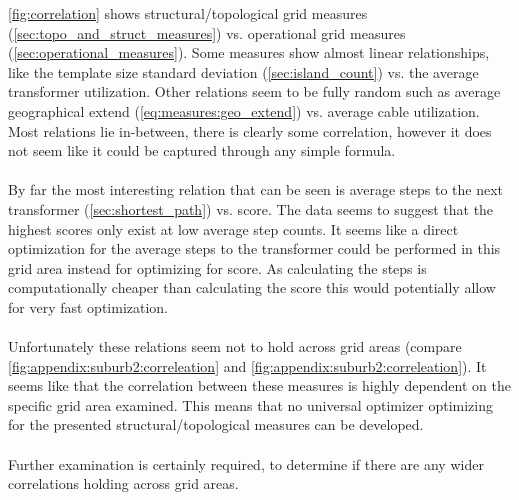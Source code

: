 \autoref{fig:correlation} shows structural/topological grid
measures (\autoref{sec:topo_and_struct_measures}) vs. 
operational grid measures (\autoref{sec:operational_measures}). 
Some measures show almost linear relationships, like
the template size standard deviation (\autoref{sec:island_count}) vs.
the average transformer utilization. Other relations seem
to be fully random such as average geographical extend (\autoref{eq:measures:geo_extend})
vs. average cable utilization. Most relations lie in-between, there is
clearly some correlation, however it does not seem like it could
be captured through any simple formula.\\
\\
By far the most interesting relation that can be seen is 
average steps to the next transformer (\autoref{sec:shortest_path})
vs. score. The data seems to
suggest that the highest scores only exist at low average
step counts. It seems like a direct optimization for 
the average steps to the transformer could be performed in this grid
area instead for optimizing for score. As calculating the steps
is computationally cheaper than calculating the score this would
potentially allow for very fast optimization.\\
\\
Unfortunately these relations seem not to hold across grid areas
(compare \autoref{fig:appendix:suburb2:correleation} and \autoref{fig:appendix:suburb2:correleation}).
It seems like that the correlation between these measures is highly
dependent on the specific grid area examined. This means that
no universal optimizer optimizing for the presented
structural/topological measures can be developed.\\
\\
Further examination is certainly required, to determine if there
are any wider correlations holding across grid areas.


